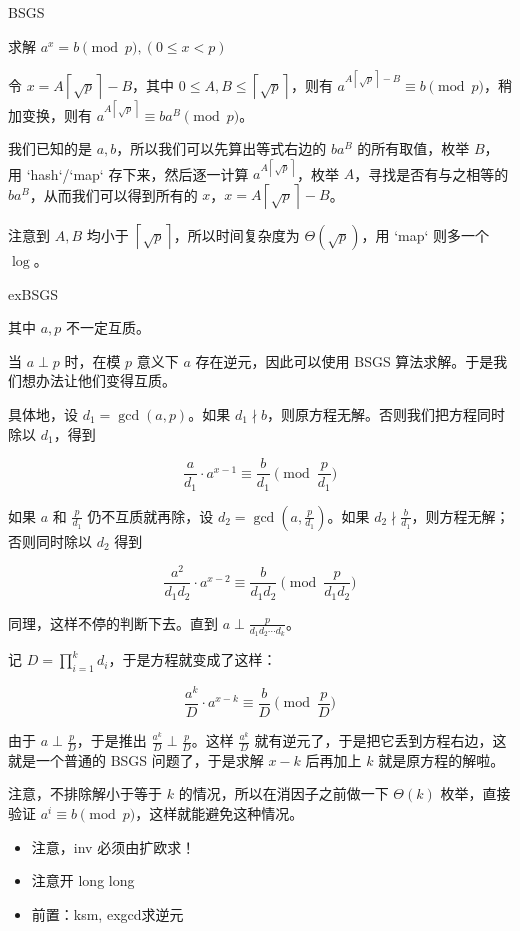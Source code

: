 BSGS

求解 $a^x=b\pmod{p}, (0\le x< p)$

令 $x = A \left \lceil \sqrt p \right \rceil - B$，其中 $0\le A,B \le \left \lceil \sqrt p \right \rceil$，则有 $a^{A\left \lceil \sqrt p \right \rceil -B} \equiv b \pmod p$，稍加变换，则有 $a^{A\left \lceil \sqrt p \right \rceil} \equiv ba^B \pmod p$。

我们已知的是 $a,b$，所以我们可以先算出等式右边的 $ba^B$ 的所有取值，枚举 $B$，用 `hash`/`map` 存下来，然后逐一计算 $a^{A\left \lceil \sqrt p \right \rceil}$，枚举 $A$，寻找是否有与之相等的 $ba^B$，从而我们可以得到所有的 $x$，$x=A \left \lceil \sqrt p \right \rceil - B$。

注意到 $A,B$ 均小于 $\left \lceil \sqrt p \right \rceil$，所以时间复杂度为 $\Theta\left (\sqrt p\right )$，用 `map` 则多一个 $\log$。

\noindent exBSGS

其中 $a,p$ 不一定互质。

当 $a\perp p$ 时，在模 $p$ 意义下 $a$ 存在逆元，因此可以使用 BSGS 算法求解。于是我们想办法让他们变得互质。

具体地，设 $d_1=\gcd(a,p)$。如果 $d_1\nmid b$，则原方程无解。否则我们把方程同时除以 $d_1$，得到

$$ \frac{a}{d_1}\cdot a^{x-1}\equiv \frac{b}{d_1}\pmod{\frac{p}{d_1}} $$

如果 $a$ 和 $\frac{p}{d_1}$ 仍不互质就再除，设 $d_2=\gcd\left(a,\frac{p}{d_1}\right)$。如果 $d_2\nmid \frac{b}{d_1}$，则方程无解；否则同时除以 $d_2$ 得到

$$ \frac{a^2}{d_1d_2}\cdot a^{x-2}≡\frac{b}{d_1d_2} \pmod{\frac{p}{d_1d_2}} $$

同理，这样不停的判断下去。直到 $a\perp \frac{p}{d_1d_2\cdots d_k}$。

记 $D=\prod_{i=1}^kd_i$，于是方程就变成了这样：

$$ \frac{a^k}{D}\cdot a^{x-k}\equiv\frac{b}{D} \pmod{\frac{p}{D}} $$

由于 $a\perp\frac{p}{D}$，于是推出 $\frac{a^k}{D}\perp \frac{p}{D}$。这样 $\frac{a^k}{D}$ 就有逆元了，于是把它丢到方程右边，这就是一个普通的 BSGS 问题了，于是求解 $x-k$ 后再加上 $k$ 就是原方程的解啦。

注意，不排除解小于等于 $k$ 的情况，所以在消因子之前做一下 $\Theta(k)$ 枚举，直接验证 $a^i\equiv b \pmod p$，这样就能避免这种情况。

\begin{itemize}
    \item 注意，inv 必须由扩欧求！
    \item 注意开 long long
    \item 前置：ksm, exgcd求逆元
\end{itemize}


